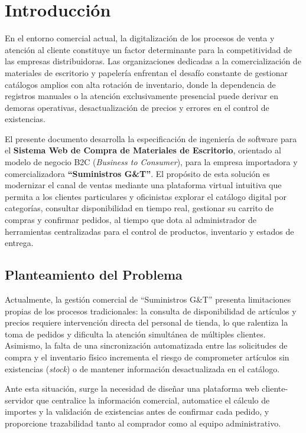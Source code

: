 \section{Introducción}

En el entorno comercial actual, la digitalización de los procesos de venta y atención al cliente constituye un factor determinante para la competitividad de las empresas distribuidoras. Las organizaciones dedicadas a la comercialización de materiales de escritorio y papelería enfrentan el desafío constante de gestionar catálogos amplios con alta rotación de inventario, donde la dependencia de registros manuales o la atención exclusivamente presencial puede derivar en demoras operativas, desactualización de precios y errores en el control de existencias.

El presente documento desarrolla la especificación de ingeniería de software para el \textbf{Sistema Web de Compra de Materiales de Escritorio}, orientado al modelo de negocio B2C (\textit{Business to Consumer}), para la empresa importadora y comercializadora \textbf{``Suministros G\&T''}. El propósito de esta solución es modernizar el canal de ventas mediante una plataforma virtual intuitiva que permita a los clientes particulares y oficinistas explorar el catálogo digital por categorías, consultar disponibilidad en tiempo real, gestionar su carrito de compras y confirmar pedidos, al tiempo que dota al administrador de herramientas centralizadas para el control de productos, inventario y estados de entrega.

\subsection{Planteamiento del Problema}

Actualmente, la gestión comercial de ``Suministros G\&T'' presenta limitaciones propias de los procesos tradicionales: la consulta de disponibilidad de artículos y precios requiere intervención directa del personal de tienda, lo que ralentiza la toma de pedidos y dificulta la atención simultánea de múltiples clientes. Asimismo, la falta de una sincronización automatizada entre las solicitudes de compra y el inventario físico incrementa el riesgo de comprometer artículos sin existencias (\textit{stock}) o de mantener información desactualizada en el catálogo.

Ante esta situación, surge la necesidad de diseñar una plataforma web cliente-servidor que centralice la información comercial, automatice el cálculo de importes y la validación de existencias antes de confirmar cada pedido, y proporcione trazabilidad tanto al comprador como al equipo administrativo.

